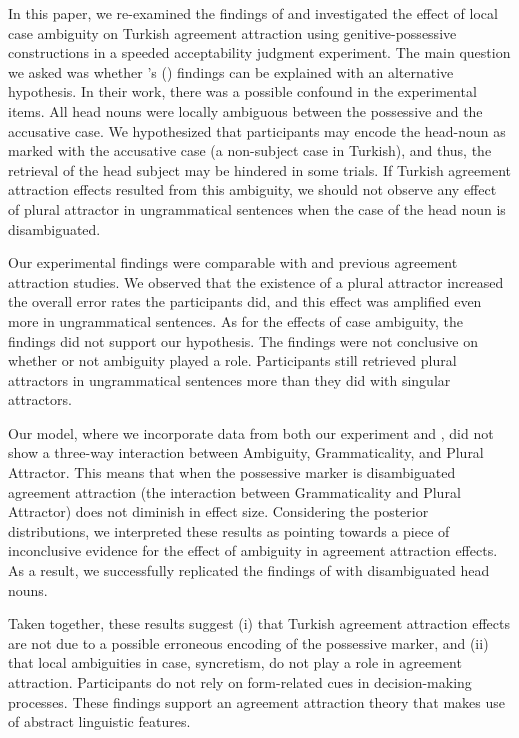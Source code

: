 \documentclass[brill,linguex]{glossa}\usepackage[]{graphicx}\usepackage[]{color}
\begin{document}
In this paper, we re-examined the findings of \citet{LagoEtAl:2019} and investigated the effect of local case ambiguity on Turkish agreement attraction using genitive-possessive constructions in a speeded acceptability judgment experiment. The main question we asked was whether \citeauthor{LagoEtAl:2019}'s (\citeyear{LagoEtAl:2019}) findings can be explained with an alternative hypothesis. In their work, there was a possible confound in the experimental items. All head nouns were locally ambiguous between the possessive and the accusative case. We hypothesized that participants may encode the head-noun as marked with the accusative case (a non-subject case in Turkish), and thus, the retrieval of the head subject may be hindered in some trials. If Turkish agreement attraction effects resulted from this ambiguity, we should not observe any effect of plural attractor in ungrammatical sentences when the case of the head noun is disambiguated.      
  
Our experimental findings were comparable with \citet{LagoEtAl:2019} and previous agreement attraction studies. We observed that the existence of a plural attractor increased the overall error rates the participants did, and this effect was amplified even more in ungrammatical sentences. As for the effects of case ambiguity, the findings did not support our hypothesis. The findings were not conclusive on whether or not ambiguity played a role. Participants still retrieved plural attractors in ungrammatical sentences more than they did with singular attractors. 
  
Our model, where we incorporate data from both our experiment and \citet{LagoEtAl:2019}, did not show a three-way interaction between Ambiguity, Grammaticality, and Plural Attractor. This means that when the possessive marker is disambiguated agreement attraction (the interaction between Grammaticality and Plural Attractor) does not diminish in effect size. Considering the posterior distributions, we interpreted these results as pointing towards a piece of inconclusive evidence for the effect of ambiguity in agreement attraction effects. As a result, we successfully replicated the findings of \citet{LagoEtAl:2019} with disambiguated head nouns. 
  
Taken together, these results suggest (i) that Turkish agreement attraction effects are not due to a possible erroneous encoding of the possessive marker, and (ii) that local ambiguities in case, syncretism, do not play a role in agreement attraction. Participants do not rely on form-related cues in decision-making processes. These findings support an agreement attraction theory that makes use of abstract linguistic features.
  
\end{document}
